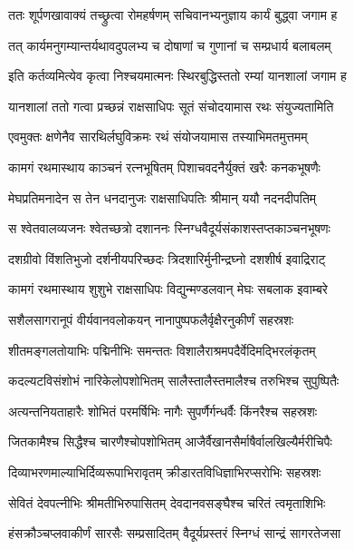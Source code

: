 
\twolineshloka
{ततः शूर्पणखावाक्यं तच्छ्रुत्वा रोमहर्षणम्}
{सचिवानभ्यनुज्ञाय कार्यं बुद्ध्वा जगाम ह} %

\twolineshloka
{तत् कार्यमनुगम्यान्तर्यथावदुपलभ्य च}
{दोषाणां च गुणानां च सम्प्रधार्य बलाबलम्} %

\twolineshloka
{इति कर्तव्यमित्येव कृत्वा निश्चयमात्मनः}
{स्थिरबुद्धिस्ततो रम्यां यानशालां जगाम ह} %

\twolineshloka
{यानशालां ततो गत्वा प्रच्छन्नं राक्षसाधिपः}
{सूतं संचोदयामास रथः संयुज्यतामिति} %

\twolineshloka
{एवमुक्तः क्षणेनैव सारथिर्लघुविक्रमः}
{रथं संयोजयामास तस्याभिमतमुत्तमम्} %

\twolineshloka
{कामगं रथमास्थाय काञ्चनं रत्नभूषितम्}
{पिशाचवदनैर्युक्तं खरैः कनकभूषणैः} %

\twolineshloka
{मेघप्रतिमनादेन स तेन धनदानुजः}
{राक्षसाधिपतिः श्रीमान् ययौ नदनदीपतिम्} %

\twolineshloka
{स श्वेतवालव्यजनः श्वेतच्छत्रो दशाननः}
{स्निग्धवैदूर्यसंकाशस्तप्तकाञ्चनभूषणः} %

\twolineshloka
{दशग्रीवो विंशतिभुजो दर्शनीयपरिच्छदः}
{त्रिदशारिर्मुनीन्द्रघ्नो दशशीर्ष इवाद्रिराट्} %

\twolineshloka
{कामगं रथमास्थाय शुशुभे राक्षसाधिपः}
{विद्युन्मण्डलवान् मेघः सबलाक इवाम्बरे} %

\twolineshloka
{सशैलसागरानूपं वीर्यवानवलोकयन्}
{नानापुष्पफलैर्वृक्षैरनुकीर्णं सहस्रशः} %

\twolineshloka
{शीतमङ्गलतोयाभिः पद्मिनीभिः समन्ततः}
{विशालैराश्रमपदैर्वेदिमद्भिरलंकृतम्} %

\twolineshloka
{कदल्यटविसंशोभं नारिकेलोपशोभितम्}
{सालैस्तालैस्तमालैश्च तरुभिश्च सुपुष्पितैः} %

\twolineshloka
{अत्यन्तनियताहारैः शोभितं परमर्षिभिः}
{नागैः सुपर्णैर्गन्धर्वैः किंनरैश्च सहस्रशः} %

\twolineshloka
{जितकामैश्च सिद्धैश्च चारणैश्चोपशोभितम्}
{आजैर्वैखानसैर्माषैर्वालखिल्यैर्मरीचिपैः} %

\twolineshloka
{दिव्याभरणमाल्याभिर्दिव्यरूपाभिरावृतम्}
{क्रीडारतविधिज्ञाभिरप्सरोभिः सहस्रशः} %

\twolineshloka
{सेवितं देवपत्नीभिः श्रीमतीभिरुपासितम्}
{देवदानवसङ्घैश्च चरितं त्वमृताशिभिः} %

\twolineshloka
{हंसक्रौञ्चप्लवाकीर्णं सारसैः सम्प्रसादितम्}
{वैदूर्यप्रस्तरं स्निग्धं सान्द्रं सागरतेजसा} %

